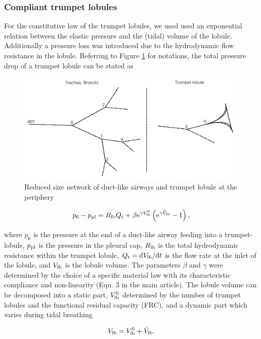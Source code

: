 \subsubsection{Compliant trumpet lobules}
For the constitutive law of the trumpet lobules, we used used an exponential relation between the elastic pressure and the (tidal) volume of the lobule.
Additionally a pressure loss was introduced due to the hydrodynamic flow resistance in the lobule.
Referring to Figure \ref{fig:network} for notations, the total pressure drop of a trumpet lobule can be stated as

\begin{figure}[b!]
\centering
\includegraphics[width=\textwidth]{figures/network}
\caption{Reduced size network of duct-like airways and trumpet lobule at the periphery}
\label{fig:network}
\end{figure}

\begin{equation} \label{eqn:governingequation}
p_6 - p_{\mathrm{pl}} = R_{\mathrm{lb}} Q_{\mathrm{t}} + \beta\mathrm{e}^{\gamma V_{\mathrm{lb}}^0}\left(\mathrm{e}^{\gamma \tilde{V}_{\mathrm{lb}}} - 1 \right) \text{,}
\end{equation}

where $p_6$ is the pressure at the end of a duct-like airway feeding into a trumpet-lobule, $p_{\mathrm{pl}}$ is the pressure in the pleural cap, $R_{\mathrm{lb}}$ is the total hydrodynamic resistance within the trumpet lobule, $Q_{\mathrm{t}} = \mathrm{d} V_{\mathrm{lb}} / \mathrm{d} t$ is the flow rate at the inlet of the lobule, and $V_{\mathrm{lb}}$ is the lobule volume.
The parameters $\beta$ and $\gamma$ were determined by the choice of a specific material law with its characteristic compliance and non-linearity (Equ. 3 in the main article).
The lobule volume can be decomposed into a static part, $V_{\mathrm{lb}}^0$ determined by the number of trumpet lobules and the functional residual capacity (FRC), and a dynamic part which varies during tidal breathing

\begin{equation}
V_{\mathrm{lb}} = V_{\mathrm{lb}}^0 + \tilde{V}_{\mathrm{lb}} \text{.}
\end{equation}

